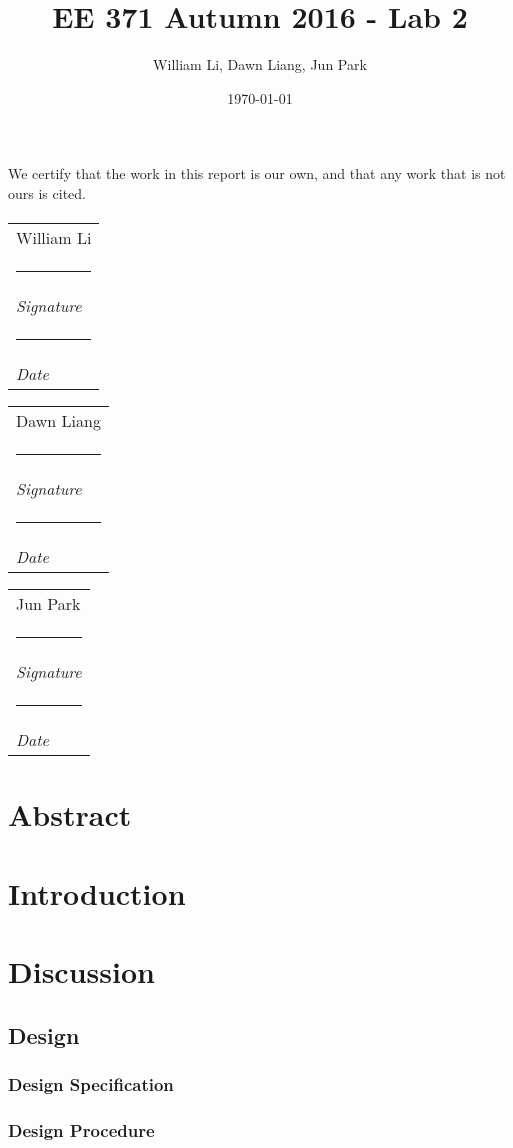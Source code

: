 \documentclass{article}
\title{EE 371 Autumn 2016 - Lab 2}
\date{\today}
\author{William Li, Dawn Liang, Jun Park}
\begin{document}
\newcommand{\namesigdate}[2][5cm]{
  \begin{tabular}{@{}p{#1}@{}}
    #2 \\[2\normalbaselineskip] \hrule \\[0pt]
    {\small \textit{Signature}} \\[2\normalbaselineskip] \hrule \\[0pt]
    {\small \textit{Date}}
  \end{tabular}
}

\maketitle
\newpage

\paragraph{} We certify that the work in this report is our own, and that any work that is not ours is cited.

\paragraph{} \noindent \namesigdate{William Li} \hfill \namesigdate{Dawn Liang} \hfill \namesigdate{Jun Park}
\newpage

\tableofcontents
\newpage


\section{Abstract}


\section{Introduction}


\section{Discussion}
\subsection{Design}
\subsubsection{Design Specification}
\subsubsection{Design Procedure}
\end{document}
